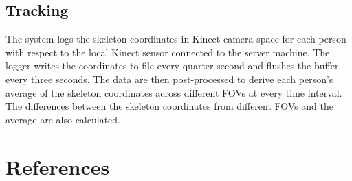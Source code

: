 \documentclass[paper=a4, fontsize=11pt]{scrartcl}
\numberwithin{equation}{section}		%
\numberwithin{figure}{section}			%
\numberwithin{table}{section}				%
\begin{document}
\subsection{Tracking}

The system logs the skeleton coordinates in Kinect camera space for each person with respect to the local Kinect sensor connected to the server machine. The logger writes the coordinates to file every quarter second and flushes the buffer every three seconds. The data are then post-processed to derive each person's average of the skeleton coordinates across different FOVs at every time interval. The differences between the skeleton coordinates from different FOVs and the average are also calculated.

\section{References}


\end{document}
